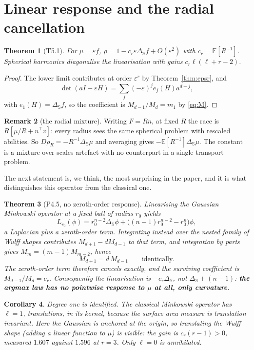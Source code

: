 \documentclass[11pt]{article}
\newtheorem{theorem}{Theorem}[section]
\newtheorem{corollary}[theorem]{Corollary}
\theoremstyle{definition}
\newtheorem{remark}[theorem]{Remark}
\newcommand{\E}{\mathbb{E}}
\newcommand{\Sph}{\mathbb{S}}
\newcommand{\Lap}{\Delta_{\Sph}}
\begin{document}
\section{Linear response and the radial cancellation}\label{sec:linear}

\begin{theorem}[\textsf{T5.1}]\label{thm:linear}
For $\mu=\varepsilon f$,
$\rho=1-c_{r}\varepsilon\Lap f+O(\varepsilon^{2})$ with
$c_{r}=\E[R^{-1}]$. Spherical harmonics diagonalise the linearisation with
gains $c_{r}\ell(\ell+r-2)$.
\end{theorem}
\begin{proof}
The lower limit contributes at order $\varepsilon^{r}$ by
Theorem~\ref{thm:epsr}, and
\[
  \det(aI-\varepsilon H)=\sum_{j}(-\varepsilon)^{j}e_{j}(H)a^{d-j},
\]
with $e_{1}(H)=\Lap f$, so the coefficient is $M_{d-1}/M_{d}=m_{1}$ by
\eqref{eq:M}.
\end{proof}

\begin{remark}[the radial mixture]
Writing $F=Rn$, at fixed $R$ the race is $R[\mu/R+n^{\top}v]$: every radius
sees the same spherical problem with rescaled abilities. So
$D\rho_{R}=-R^{-1}\Lap\mu$ and averaging gives $-\E[R^{-1}]\Lap\mu$. The
constant is a mixture-over-scales artefact with no counterpart in a single
transport problem.
\end{remark}

The next statement is, we think, the most surprising in the paper, and it is
what distinguishes this operator from the classical one.

\begin{theorem}[\textsf{P4.5}, no zeroth-order response]\label{thm:cancel}
Linearising the Gaussian Minkowski operator at a \emph{fixed} ball of radius
$r_{0}$ yields \cite{HXZ}
\[
  L_{r_{0}}(\phi)=r_{0}^{n-2}\Lap\phi
  +\bigl((n-1)r_{0}^{n-2}-r_{0}^{n}\bigr)\phi,
\]
a Laplacian \emph{plus} a zeroth-order term. Integrating instead over the
nested family of Wulff shapes contributes $M_{d+1}-dM_{d-1}$ to that term, and
integration by parts gives $M_{m}=(m-1)M_{m-2}$, hence
\[
  M_{d+1}=d\,M_{d-1}\qquad\text{identically.}
\]
The zeroth-order term therefore cancels exactly, and the surviving coefficient
is $M_{d-1}/M_{d}=c_{r}$. Consequently the linearisation is $-c_{r}\Lap$, not
$\Lap+(n-1)$: \textbf{the argmax law has no pointwise response to $\mu$ at all,
only curvature}.
\end{theorem}

\begin{corollary}\label{cor:l1}
Degree one is \emph{identified}. The classical Minkowski operator has
$\ell=1$, translations, in its kernel, because the surface area measure
is translation invariant. Here the Gaussian is anchored at the origin, so
translating the Wulff shape (adding a linear function to $\mu$) is visible: the
gain is $c_{r}(r-1)>0$, measured $1.607$ against $1.596$ at $r=3$. Only
$\ell=0$ is annihilated.
\end{corollary}
\end{document}

